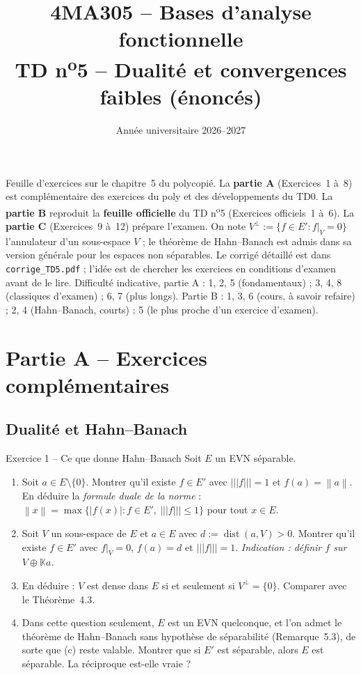 \documentclass[11pt,a4paper]{article}
\title{\textbf{4MA305 -- Bases d'analyse fonctionnelle}\\[2mm]
\Large TD n\textsuperscript{o}5 -- Dualité et convergences faibles (énoncés)}
\author{}
\date{Année universitaire 2026--2027}
\newcommand{\K}{\mathbb{K}}
\newcommand{\dist}{\operatorname{dist}}
\newcommand{\norm}[1]{\left\|#1\right\|}
\newcommand{\opnorm}[1]{|\!|\!|#1|\!|\!|}
\theoremstyle{definition}
\begin{document}
\maketitle

\begin{commentaire}
Feuille d'exercices sur le chapitre~5 du polycopié. La \textbf{partie A} (Exercices~1 à~8) est complémentaire des exercices du poly et des développements du TD0. La \textbf{partie B} reproduit la \textbf{feuille officielle} du TD n\textsuperscript{o}5 (Exercices officiels~1 à~6). La \textbf{partie C} (Exercices~9 à~12) prépare l'examen. On note $V^\perp:=\{f\in E':f|_V=0\}$ l'annulateur d'un sous-espace $V$ ; le théorème de Hahn--Banach est admis dans sa version générale pour les espaces non séparables. Le corrigé détaillé est dans \texttt{corrige\_TD5.pdf} ; l'idée est de chercher les exercices en conditions d'examen avant de le lire. Difficulté indicative, partie A : 1, 2, 5 (fondamentaux) ; 3, 4, 8 (classiques d'examen) ; 6, 7 (plus longs). Partie B : 1, 3, 6 (cours, à savoir refaire) ; 2, 4 (Hahn--Banach, courts) ; 5 (le plus proche d'un exercice d'examen).
\end{commentaire}

\section*{Partie A -- Exercices complémentaires}
\subsection*{Dualité et Hahn--Banach}

\begin{exo}{Exercice 1 -- Ce que donne Hahn--Banach}
Soit $E$ un EVN séparable.
\begin{enumerate}[label=(\alph*)]
  \item Soit $a\in E\setminus\{0\}$. Montrer qu'il existe $f\in E'$ avec $\opnorm f=1$ et $f(a)=\norm a$. En déduire la \emph{formule duale de la norme} : $\norm x=\max\{|f(x)|:f\in E',\ \opnorm f\le1\}$ pour tout $x\in E$.
  \item Soit $V$ un sous-espace de $E$ et $a\in E$ avec $d:=\dist(a,V)>0$. Montrer qu'il existe $f\in E'$ avec $f|_V=0$, $f(a)=d$ et $\opnorm f=1$. \emph{Indication : définir $f$ sur $V\oplus\K a$.}
  \item En déduire : $V$ est dense dans $E$ si et seulement si $V^\perp=\{0\}$. Comparer avec le Théorème~4.3.
  \item Dans cette question seulement, $E$ est un EVN quelconque, et l'on admet le théorème de Hahn--Banach sans hypothèse de séparabilité (Remarque~5.3), de sorte que (c) reste valable. Montrer que si $E'$ est séparable, alors $E$ est séparable. La réciproque est-elle vraie ?
\end{enumerate}
\end{exo}
\end{document}

